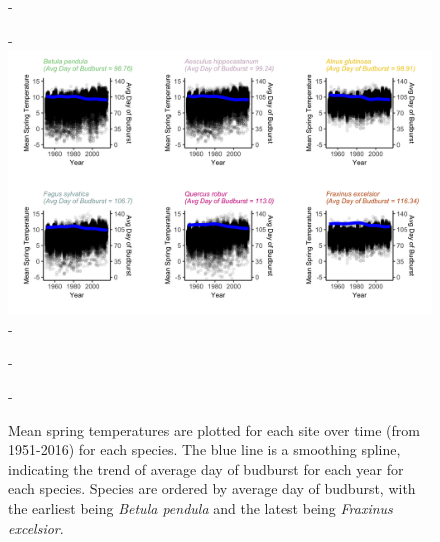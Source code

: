 \documentclass{article}\usepackage[]{graphicx}\usepackage[]{color}
\begin{document}
{\begin{figure} [H]
  -\begin{center}
  -\includegraphics[width=16cm]{..//figures/MSTBB_bySpp.png}
  -\caption{Mean spring temperatures are plotted for each site over time (from 1951-2016) for each species. The blue line is a smoothing spline, indicating the trend of average day of budburst for each year for each species. Species are ordered by average day of budburst, with the earliest being \textit{Betula pendula} and the latest being \textit{Fraxinus excelsior}. }\label{fig:mst}
  -\end{center}
  -\end{figure}}
  
\end{document}
